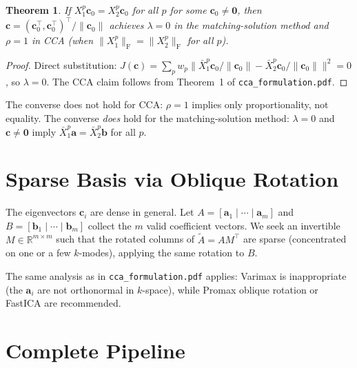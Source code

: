 \documentclass[a4paper,11pt]{article}
\newcommand{\va}{\bm{a}}
\newcommand{\vb}{\bm{b}}
\newcommand{\vc}{\bm{c}}
\newcommand{\Xb}[2]{X_{#1}^{#2}}
\newcommand{\Xn}[2]{\bar{X}_{#1}^{#2}}
\newcommand{\frob}[1]{\lVert #1 \rVert_{\mathrm{F}}}
\theoremstyle{plain}
\newtheorem{theorem}{Theorem}
\begin{document}
\begin{theorem}
\label{thm:equiv}
If $\Xb{1}{p}\vc_0 = \Xb{2}{p}\vc_0$ for all $p$ for some $\vc_0 \neq \bm{0}$,
then $\vc = (\vc_0^\top, \vc_0^\top)^\top / \|\vc_0\|$ achieves $\lambda = 0$
in the matching-solution method and $\rho = 1$ in CCA (when
$\frob{\Xb{1}{p}} = \frob{\Xb{2}{p}}$ for all $p$).
\end{theorem}

\begin{proof}
Direct substitution: $J(\vc) = \sum_p w_p\|\Xn{1}{p}\vc_0/\|\vc_0\|
- \Xn{2}{p}\vc_0/\|\vc_0\|\|^2 = 0$, so $\lambda = 0$.
The CCA claim follows from Theorem~1 of \texttt{cca\_formulation.pdf}.
\end{proof}

The converse does not hold for CCA: $\rho = 1$ implies only proportionality,
not equality.
The converse \emph{does} hold for the matching-solution method: $\lambda = 0$
and $\vc\neq\bm{0}$ imply $\Xn{1}{p}\va = \Xn{2}{p}\vb$ for all $p$.

\section{Sparse Basis via Oblique Rotation}
\label{sec:sparsity}

The eigenvectors $\vc_i$ are dense in general.
Let $A = [\va_1 \mid \cdots \mid \va_m]$ and
$B = [\vb_1 \mid \cdots \mid \vb_m]$ collect the $m$ valid coefficient vectors.
We seek an invertible $M \in \mathbb{R}^{m\times m}$ such that the rotated
columns of $\tilde{A} = AM^\top$ are sparse (concentrated on one or a few
$k$-modes), applying the same rotation to $B$.

The same analysis as in \texttt{cca\_formulation.pdf} applies: Varimax is
inappropriate (the $\va_i$ are not orthonormal in $k$-space), while Promax
oblique rotation or FastICA are recommended.

\section{Complete Pipeline}
\label{sec:pipeline}
\end{document}
